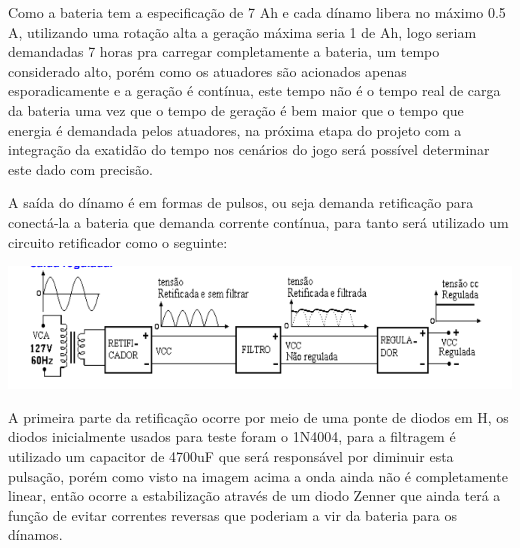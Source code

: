 Como a bateria tem a especificação de 7 Ah e cada dínamo libera no máximo 0.5 A, utilizando uma rotação alta a geração máxima seria 1 de Ah, logo seriam demandadas 7 horas pra carregar completamente a bateria, um tempo considerado alto, porém como os atuadores são acionados apenas esporadicamente e a geração é contínua, este tempo não é o tempo real de carga da bateria uma vez que o tempo de geração é bem maior que o tempo que energia é demandada pelos atuadores, na próxima etapa do projeto com a integração da exatidão do tempo nos cenários do jogo será possível determinar este dado com precisão.

A saída do dínamo é em formas de pulsos, ou seja demanda retificação para conectá-la a bateria que demanda corrente contínua, para tanto será utilizado um circuito retificador como o seguinte: 



 \begin{center}
    	\includegraphics[scale=0.7]{figuras/ret}
        \label{ret}
    \end{center}

A primeira parte da retificação ocorre por meio de uma ponte de diodos em H, os diodos inicialmente usados para teste foram o 1N4004, para a filtragem é utilizado um capacitor de 4700uF que será responsável por diminuir esta pulsação, porém como visto na imagem acima a onda ainda não é completamente linear, então ocorre a estabilização através de um diodo Zenner que ainda terá a função de evitar correntes reversas que poderiam a vir da bateria para os dínamos. 






























